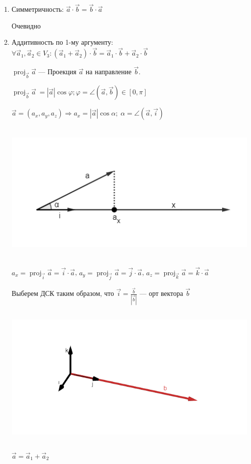 \documentclass[twoside]{book}
\DeclareMathOperator{\proj}{proj}
\begin{document}
\begin{enumerate}
    \item Симметричность: \(\vec a \cdot \vec b = \vec b \cdot \vec a\)

          Очевидно
    \item Аддитивность по 1-му аргументу: \(\forall \vec a_1, \vec a_2 \in V_3:
          (\vec a_1 + \vec a_2) \cdot \vec b = \vec a_1 \cdot \vec b + \vec a_2 \cdot \vec b\)

          \(\proj_{\vec b}\vec a\) --- Проекция \(\vec a\) на направление \(\vec b\).

          \(\proj_{\vec b}\vec a\ = |\vec a| \cos \varphi; \varphi = \angle(\vec a, \vec b) \in [0, \pi]\)

          \(\vec a = (a_x, a_y, a_z) \Rightarrow a_x = |\vec a| \cos\alpha;\; \alpha = \angle(\vec a, \vec i)\)
          \begin{center}
              \includegraphics[height=7cm]{Images/Chapter_1/1-4-2.png}
          \end{center}
          \(a_x = \proj_{\vec i}\vec a = \vec i \cdot \vec a\),
          \(a_y = \proj_{\vec j}\vec a = \vec j \cdot \vec a\),
          \(a_z = \proj_{\vec k}\vec a = \vec k \cdot \vec a\)

          Выберем ДСК таким образом, что \(\vec i = \frac{\vec b}{|\vec b|}\) --- орт вектора \(\vec b\)
          \begin{center}
              \includegraphics[height=7cm]{Images/Chapter_1/1-4-3.png}
          \end{center}
          \(\vec a = \vec a_1 + \vec a_2\)


\end{enumerate}
\end{document}
